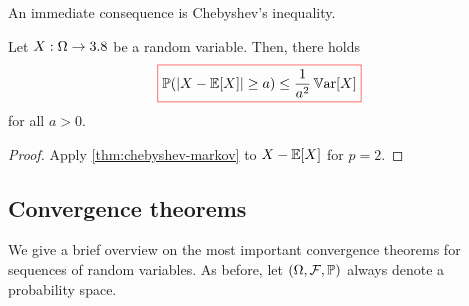 An immediate consequence is Chebyshev's inequality.

\begin{corollary}\label{cor:chebyshev}
Let $X : \Omega \to 3.8$ be a random variable.
Then, there holds
\begin{equation}\label{eq:chebyshev}
{\color{red}\boxed{\color{black}
\mathbb{P}(|X-\operatorname{\mathbb{E}}[X]| \geq a)
\leq
\frac{1}{a^2}\operatorname{\mathbb{V}ar}[X]
}}
\end{equation}
for all $a > 0$.
\end{corollary}
\begin{proof}
Apply \autoref{thm:chebyshev-markov} to $X-\operatorname{\mathbb{E}}[X]$ for $p=2$.
\end{proof}


\subsection{Convergence theorems}

We give a brief overview on the most important convergence theorems for sequences of random variables.
As before, let $(\Omega,\mathcal{F},\mathbb{P})$ always denote a probability space.

